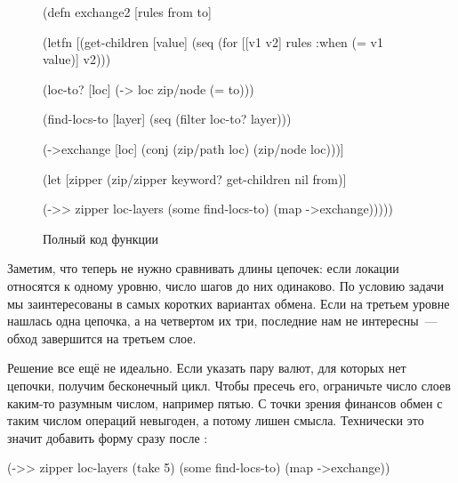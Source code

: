 \begin{figure}[ht!]

\begin{english}
  \begin{clojure}
(defn exchange2 [rules from to]

  (letfn [(get-children [value]
            (seq (for [[v1 v2] rules
                       :when (= v1 value)]
                   v2)))

          (loc-to? [loc]
            (-> loc zip/node (= to)))

          (find-locs-to [layer]
            (seq (filter loc-to? layer)))

          (->exchange [loc]
            (conj (zip/path loc) (zip/node loc)))]

    (let [zipper (zip/zipper keyword?
                             get-children
                             nil
                             from)]

      (->> zipper
           loc-layers
           (some find-locs-to)
           (map ->exchange)))))
  \end{clojure}
\end{english}

\captionsetup{labelformat=lis}
\caption{Полный код функции }

\label{fig:chart-xml-04}

\end{figure}

Заметим, что теперь не нужно сравнивать длины цепочек: если локации относятся к
одному уровню, число шагов до них одинаково. По условию задачи мы заинтересованы
в самых коротких вариантах обмена. Если на третьем уровне нашлась одна цепочка,
а на четвертом их три, последние нам не интересны~--- обход завершится на третьем
слое.


Решение все ещё не идеально. Если указать пару валют, для которых нет цепочки,
получим бесконечный цикл. Чтобы пресечь его, ограничьте число слоев каким-то
разумным числом, например пятью. С точки зрения финансов обмен с таким числом
операций невыгоден, а потому лишен смысла. Технически это значит добавить форму
 сразу после :

\begin{english}
  \begin{clojure}
(->> zipper
     loc-layers
     (take 5)
     (some find-locs-to)
     (map ->exchange))
  \end{clojure}
\end{english}

